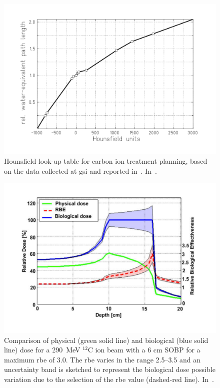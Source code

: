  \begin{figure}[!htbp]
\centering
\includegraphics[width=0.6\linewidth]{03_GraphicFiles/chapter1_Introduction/HounsfieldUnits.pdf}	
\caption{Hounsfield look-up table for carbon ion treatment planning, based on the data collected at \gls{gsi} and reported in~\cite{Jakel2001}. In~\cite{Rietzel2007}.}
\label{chap1::fig::HU}
\end{figure}
 \begin{figure}[!htbp]
\centering
\includegraphics[width=0.6\linewidth]{03_GraphicFiles/chapter1_Introduction/rbeWeightedDose.pdf}
\caption{Comparison of physical (green solid line) and biological (blue solid line) dose for a 290~MeV $^{12}$C ion beam with a 6 cm SOBP for a maximum \gls{rbe} of 3.0. The \gls{rbe} varies in the range 2.5–3.5 and an uncertainty band is sketched to represent the biological dose possible variation due to the selection of the \gls{rbe} value (dashed-red line). In~\cite{Suit2010}.}
\label{chap1::fig::rbeDose}
\end{figure}

